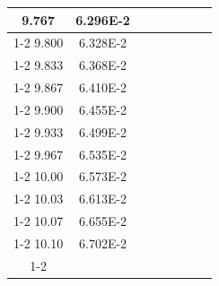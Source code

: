 \documentclass[article,12pt]{elsarticle}
\begin{document}
\begin{longtable}[c]{|c|c|cccccc}
9.767    & 6.296E-2  &                       &                              &                            &                       &                              &                               \\ \cline{1-2}
9.800    & 6.328E-2  &                       &                              &                            &                       &                              &                               \\ \cline{1-2}
9.833    & 6.368E-2  &                       &                              &                            &                       &                              &                               \\ \cline{1-2}
9.867    & 6.410E-2  &                       &                              &                            &                       &                              &                               \\ \cline{1-2}
9.900    & 6.455E-2  &                       &                              &                            &                       &                              &                               \\ \cline{1-2}
9.933    & 6.499E-2  &                       &                              &                            &                       &                              &                               \\ \cline{1-2}
9.967    & 6.535E-2  &                       &                              &                            &                       &                              &                               \\ \cline{1-2}
10.00    & 6.573E-2  &                       &                              &                            &                       &                              &                               \\ \cline{1-2}
10.03    & 6.613E-2  &                       &                              &                            &                       &                              &                               \\ \cline{1-2}
10.07    & 6.655E-2  &                       &                              &                            &                       &                              &                               \\ \cline{1-2}
10.10    & 6.702E-2  &                       &                              &                            &                       &                              &                               \\ \cline{1-2}

\end{longtable}
\end{document}
